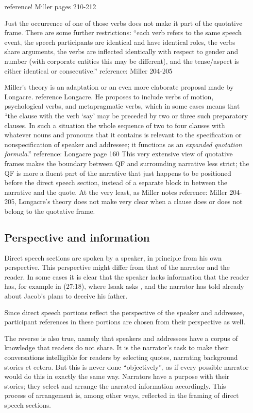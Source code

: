 \documentclass[twoside,a4paper,10pt]{article}
\newcommand{\fixme}[1]{{\color{red} #1}}
\newcommand{\hebr}[1]{\cjRL{#1}}
\begin{document}
\fixme{reference! Miller pages 210-212}

Just the occurrence of one of those verbs does not make it part of the quotative frame. There are some further restrictions: ``each verb refers to the same speech event, the speech participants are identical and have identical roles, the verbs share arguments, the verbs are inflected identically with respect to gender and number (with corporate entities this may be different), and the tense/aspect is either identical or consecutive.'' \fixme{reference: Miller 204-205}

Miller's theory is an adaptation or an even more elaborate proposal made by Longacre. \fixme{reference Longacre}. He proposes to include verbs of motion, psychological verbs, and metapragmatic verbs, which in some cases means that ``the clause with the verb `say' may be preceded by two or three such preparatory clauses. In such a situation the whole sequence of two to four clauses with whatever nouns and pronouns that it contains is relevant to the specification or nonspecification of speaker and addressee; it functions as an \emph{expanded quotation formula}.'' \fixme{reference: Longacre page 160}
This very extensive view of quotative frames makes the boundary between QF and surrounding narrative less strict; the QF is more a fluent part of the narrative that just happens to be positioned before the direct speech section, instead of a separate block in between the narrative and the quote. 
At the very least, as Miller notes \fixme{reference: Miller 204-205}, Longacre's theory does not make very clear when a clause does or does not belong to the quotative frame.

\subsection{Perspective and information}
Direct speech sections are spoken by a speaker, in principle from his own perspective. This perspective might differ from that of the narrator and the reader. In some cases it is clear that the speaker lacks information that the reader has, for example in (27:18), where Isaak asks \hebr{MJ >TH BNJ}, and the narrator has told already about Jacob's plans to deceive his father.

Since direct speech portions reflect the perspective of the speaker and addressee, participant references in these portions are chosen from their perspective as well.

The reverse is also true, namely that speakers and addressees have a corpus of knowledge that readers do not share. It is the narrator's task to make their conversations intelligible for readers by selecting quotes, narrating background stories et cetera. But this is never done ``objectively'', as if every possible narrator would do this in exactly the same way. Narrators have a purpose with their stories; they select and arrange the narrated information accordingly. This process of arrangement is, among other ways, reflected in the framing of direct speech sections.
\end{document}
